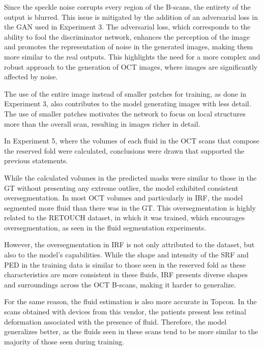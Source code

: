 \par
Since the speckle noise corrupts every region of the B-scans, the entirety of the output is blurred. This issue is mitigated by the addition of an adversarial loss in the GAN used in Experiment 3. The adversarial loss, which corresponds to the ability to fool the discriminator network, enhances the perception of the image and promotes the representation of noise in the generated images, making them more similar to the real outputs. This highlights the need for a more complex and robust approach to the generation of OCT images, where images are significantly affected by noise.
\par
The use of the entire image instead of smaller patches for training, as done in Experiment 3, also contributes to the model generating images with less detail. The use of smaller patches motivates the network to focus on local structures more than the overall scan, resulting in images richer in detail.
\par
In Experiment 5, where the volumes of each fluid in the OCT scans that compose the reserved fold were calculated, conclusions were drawn that supported the previous statements. 
\par
While the calculated volumes in the predicted masks were similar to those in the GT without presenting any extreme outlier, the model exhibited consistent oversegmentation. In most OCT volumes and particularly in IRF, the model segmented more fluid than there was in the GT. This oversegmentation is highly related to the RETOUCH dataset, in which it was trained, which encourages oversegmentation, as seen in the fluid segmentation experiments. 
\par
However, the oversegmentation in IRF is not only attributed to the dataset, but also to the model's capabilities. While the shape and intensity of the SRF and PED in the training data is similar to those seen in the reserved fold as these characteristics are more consistent in these fluids, IRF presents diverse shapes and surroundings across the OCT B-scans, making it harder to generalize.
\par
For the same reason, the fluid estimation is also more accurate in Topcon. In the scans obtained with devices from this vendor, the patients present less retinal deformation associated with the presence of fluid. Therefore, the model generalizes better, as the fluids seen in these scans tend to be more similar to the majority of those seen during training.
\par
